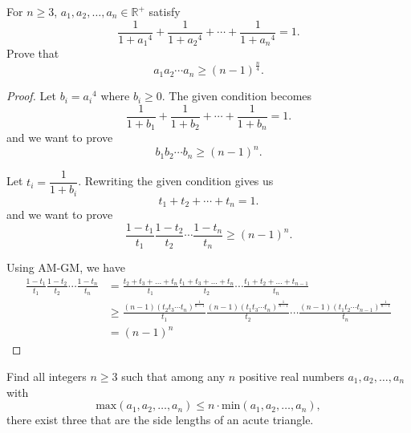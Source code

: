 \begin{prbm}[MACEDONIA 2016] 
For $n \ge 3$, $a_1, a_2, \dots , a_n \in \mathbb{R}^{+}$ satisfy \[ \frac{1}{1+{a_1}^4} + \frac{1}{1+{a_2}^4} + \cdots + \frac{1}{1+{a_n}^4} = 1. \]
Prove that 
\[ a_1 a_2 \cdots a_n \ge (n-1)^{\frac{n}{4}}. \]
\end{prbm}

\begin{proof}
Let $b_i = {a_i}^4$ where $b_i \ge 0$. 
The given condition becomes \[ \frac{1}{1+b_1} + \frac{1}{1+b_2} + \cdots + \frac{1}{1+b_n} = 1. \]
and we want to prove \[ b_1 b_2 \cdots b_n \ge (n-1)^n.\]

Let $t_i = \dfrac{1}{1+b_i}$. Rewriting the given condition gives us \[ t_1 + t_2 + \cdots + t_n = 1.\] 
and we want to prove \[ \frac{1-t_1}{t_1} \frac{1-t_2}{t_2} \cdots \frac{1-t_n}{t_n} \ge (n-1)^n. \]

Using AM-GM, we have 
\begin{align*}
\frac{1-t_1}{t_1} \frac{1-t_2}{t_2} \cdots \frac{1-t_n}{t_n}
&= \frac{t_2 + t_3 + \dots + t_n}{t_1} \frac{t_1 + t_3 + \dots + t_n}{t_2} \cdots \frac{t_1 + t_2 + \dots + t_{n-1}}{t_n} \\
&\ge \frac{(n-1)(t_2  t_3 \cdots t_n)^\frac{1}{n-1}}{t_1} \frac{(n-1)(t_1  t_3 \cdots t_n)^\frac{1}{n-1}}{t_2} \cdots \frac{(n-1)(t_1  t_2 \cdots t_{n-1})^\frac{1}{n-1}}{t_n} \\
&= (n-1)^n
\end{align*}
\end{proof}
\pagebreak

\begin{prbm}[USAMO 2012]
Find all integers $n \ge 3$ such that among any $n$ positive real numbers $a_1, a_2, \dots, a_n$ with 
\[ \text{max}(a_1, a_2, \dots, a_n) \le n \cdot \text{min}(a_1, a_2, \dots , a_n), \]
there exist three that are the side lengths of an acute triangle.
\end{prbm}

